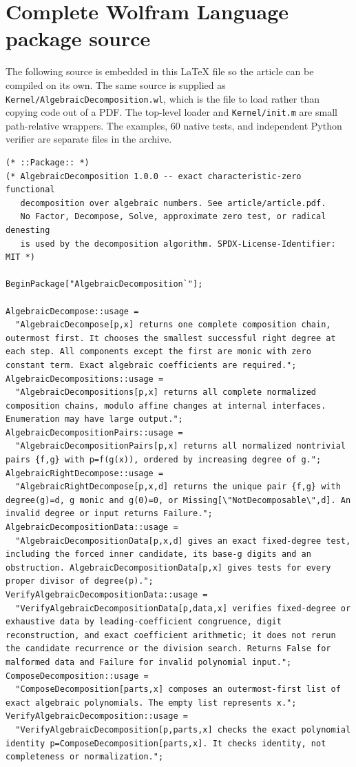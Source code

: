 \documentclass[11pt,a4paper]{article}
\numberwithin{equation}{section}
\theoremstyle{definition}
\theoremstyle{remark}
\newcommand{\code}[1]{\texttt{#1}}
\begin{document}
\clearpage
\appendix
\section{Complete Wolfram Language package source}
\label{app:source}
The following source is embedded in this \LaTeX{} file so the article can be
compiled on its own. The same source is supplied as
\code{Kernel/AlgebraicDecomposition.wl}, which is the file to load rather than
copying code out of a PDF. The top-level loader and \code{Kernel/init.m} are
small path-relative wrappers. The examples, 60 native tests, and independent
Python verifier are separate files in the archive.

\begin{lstlisting}
(* ::Package:: *)
(* AlgebraicDecomposition 1.0.0 -- exact characteristic-zero functional
   decomposition over algebraic numbers. See article/article.pdf.
   No Factor, Decompose, Solve, approximate zero test, or radical denesting
   is used by the decomposition algorithm. SPDX-License-Identifier: MIT *)

BeginPackage["AlgebraicDecomposition`"];

AlgebraicDecompose::usage =
  "AlgebraicDecompose[p,x] returns one complete composition chain, outermost first. It chooses the smallest successful right degree at each step. All components except the first are monic with zero constant term. Exact algebraic coefficients are required.";
AlgebraicDecompositions::usage =
  "AlgebraicDecompositions[p,x] returns all complete normalized composition chains, modulo affine changes at internal interfaces. Enumeration may have large output.";
AlgebraicDecompositionPairs::usage =
  "AlgebraicDecompositionPairs[p,x] returns all normalized nontrivial pairs {f,g} with p=f(g(x)), ordered by increasing degree of g.";
AlgebraicRightDecompose::usage =
  "AlgebraicRightDecompose[p,x,d] returns the unique pair {f,g} with degree(g)=d, g monic and g(0)=0, or Missing[\"NotDecomposable\",d]. An invalid degree or input returns Failure.";
AlgebraicDecompositionData::usage =
  "AlgebraicDecompositionData[p,x,d] gives an exact fixed-degree test, including the forced inner candidate, its base-g digits and an obstruction. AlgebraicDecompositionData[p,x] gives tests for every proper divisor of degree(p).";
VerifyAlgebraicDecompositionData::usage =
  "VerifyAlgebraicDecompositionData[p,data,x] verifies fixed-degree or exhaustive data by leading-coefficient congruence, digit reconstruction, and exact coefficient arithmetic; it does not rerun the candidate recurrence or the division search. Returns False for malformed data and Failure for invalid polynomial input.";
ComposeDecomposition::usage =
  "ComposeDecomposition[parts,x] composes an outermost-first list of exact algebraic polynomials. The empty list represents x.";
VerifyAlgebraicDecomposition::usage =
  "VerifyAlgebraicDecomposition[p,parts,x] checks the exact polynomial identity p=ComposeDecomposition[parts,x]. It checks identity, not completeness or normalization.";


\end{lstlisting}
\end{document}
